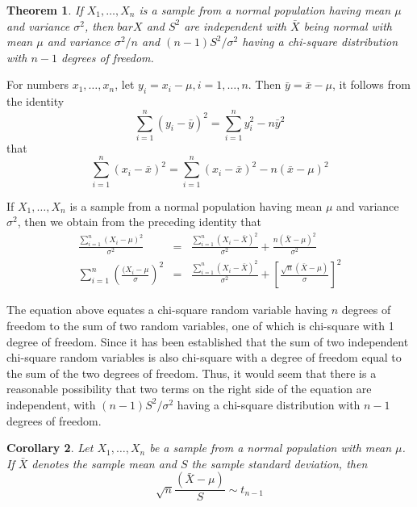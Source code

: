 \documentclass[12pt]{article}
\newtheorem{theorem}{Theorem}
\newtheorem{corollary}[theorem]{Corollary}
\begin{document}
\begin{theorem}
  If $X_1, \dots, X_n$ is a sample from a normal population having mean $\mu$ and variance $\sigma^2$, then $bar{X}$ and $S^2$ are independent with $\bar{X}$ being normal with mean $\mu$ and variance $\sigma^2/n$ and $(n-1)S^2 / \sigma^2$ having a chi-square distribution with $n-1$ degrees of freedom.
\end{theorem}

For numbers $x_1, \dots, x_n$, let $y_i = x_i - \mu, i = 1, \dots, n$. Then $\bar{y} = \bar{x} - \mu$, it follows from the identity
\begin{equation*}
  \sum_{i=1}^n (y_i - \bar{y})^2 = \sum_{i=1}^n y_i^2 - n \bar{y}^2
\end{equation*}
that
\begin{equation*}
  \sum_{i=1}^n (x_i - \bar{x})^2
  = \sum_{i=1}^n (x_i - \bar{x})^2 - n (\bar{x} - \mu)^2
\end{equation*}

If $X_1, \dots, X_n$ is a sample from a normal population having mean $\mu$ and variance $\sigma^2$, then we obtain from the preceding identity that
\begin{eqnarray*}
  \frac{\sum_{i=1}^n (X_i - \mu)^2}{\sigma^2}
  &=& \frac{\sum_{i=1}^n (X_i - \bar{X})^2}{\sigma^2}
  + \frac{n (\bar{X} - \mu)^2}{\sigma^2} \\
  \sum_{i=1}^n \left( \frac{ (X_i - \mu}{\sigma} \right)^2
  &=& \frac{\sum_{i=1}^n (X_i - \bar{X})^2}{\sigma^2}
  + \left[ \frac{\sqrt{n} (\bar{X} - \mu)}{\sigma} \right]^2
\end{eqnarray*}

The equation above equates a chi-square random variable having $n$ degrees of freedom to the sum of two random variables, one of which is chi-square with 1 degree of freedom. Since it has been established that the sum of two independent chi-square random variables is also chi-square with a degree of freedom equal to the sum of the two degrees of freedom. Thus, it would seem that there is a reasonable possibility that two terms on the right side of the equation are independent, with $(n-1)S^2 / \sigma^2$ having a chi-square distribution with $n-1$ degrees of freedom.

\begin{corollary}
  Let $X_1, \dots, X_n$ be a sample from a normal population with mean $\mu$. If $\bar{X}$ denotes the sample mean and $S$ the sample standard deviation, then
  \begin{equation*}
    \sqrt{n} \frac{(\bar{X} - \mu)}{S} \sim t_{n-1}
  \end{equation*}
\end{corollary}
\end{document}
